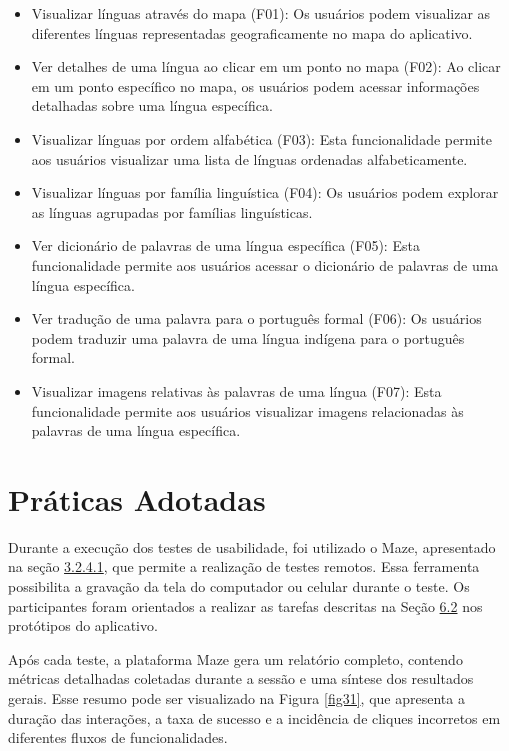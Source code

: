 \begin{itemize}

	\item Visualizar línguas através do mapa (F01): Os usuários podem visualizar as diferentes línguas representadas geograficamente no mapa do aplicativo.

    \item Ver detalhes de uma língua ao clicar em um ponto no mapa (F02): Ao clicar em um ponto específico no mapa, os usuários podem acessar informações detalhadas sobre uma língua específica.
    
    \item Visualizar línguas por ordem alfabética (F03): Esta funcionalidade permite aos usuários visualizar uma lista de línguas ordenadas alfabeticamente.
    
    \item Visualizar línguas por família linguística (F04): Os usuários podem explorar as línguas agrupadas por famílias linguísticas.
    
    \item Ver dicionário de palavras de uma língua específica (F05): Esta funcionalidade permite aos usuários acessar o dicionário de palavras de uma língua específica.
    
    \item Ver tradução de uma palavra para o português formal (F06): Os usuários podem traduzir uma palavra de uma língua indígena para o português formal.
    
    \item  Visualizar imagens relativas às palavras de uma língua (F07): Esta funcionalidade permite aos usuários visualizar imagens relacionadas às palavras de uma língua específica.

\end{itemize}

\section{Práticas Adotadas}
\label{sec:Práticas Adotadas}
Durante a execução dos testes de usabilidade, foi utilizado o Maze, apresentado na seção \hyperref[{sec:Maze}]{3.2.4.1}, que permite a realização de testes remotos. Essa ferramenta possibilita a gravação da tela do computador ou celular 
durante o teste. Os participantes foram orientados a realizar as tarefas descritas na Seção \hyperref[sec:Cenários de Uso]{6.2} nos protótipos do aplicativo.

Após cada teste, a plataforma Maze gera um relatório completo, contendo métricas detalhadas coletadas durante a sessão e uma síntese dos resultados gerais. Esse resumo pode ser visualizado na Figura \ref{fig31}, que apresenta a duração das interações, a taxa de sucesso e 
a incidência de cliques incorretos em diferentes fluxos de funcionalidades.

